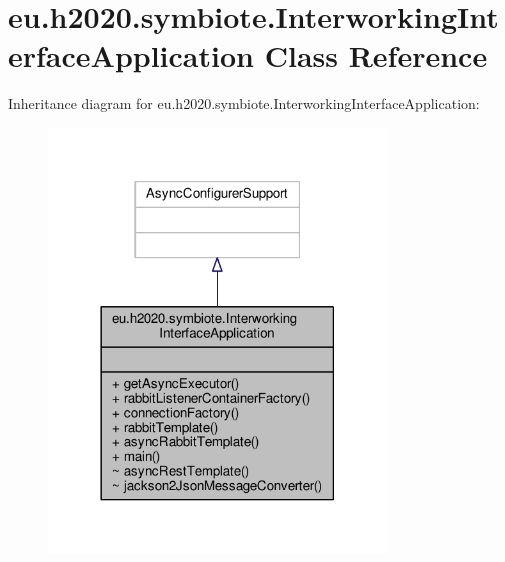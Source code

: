 \hypertarget{classeu_1_1h2020_1_1symbiote_1_1InterworkingInterfaceApplication}{}\section{eu.\+h2020.\+symbiote.\+Interworking\+Interface\+Application Class Reference}
\label{classeu_1_1h2020_1_1symbiote_1_1InterworkingInterfaceApplication}


Inheritance diagram for eu.\+h2020.\+symbiote.\+Interworking\+Interface\+Application\+:\nopagebreak
\begin{figure}[H]
\begin{center}
\leavevmode
\includegraphics[width=254pt]{classeu_1_1h2020_1_1symbiote_1_1InterworkingInterfaceApplication__inherit__graph}
\end{center}
\end{figure}


